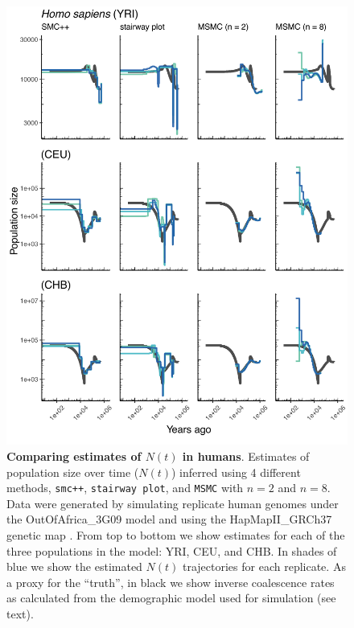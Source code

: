 \documentclass[12pt,halfline,a4paper]{ouparticle}
\newcommand{\MSMC}{\texttt{MSMC}\xspace}
\newcommand{\smcpp}{\texttt{smc++}\xspace}
\newcommand{\stairwayplot}{\texttt{stairway plot}\xspace}
\begin{document}
\begin{figure}
\begin{center}
\includegraphics[width=0.8\linewidth]{display_items/HomSap_OutOfAfrica_3G09.pdf}
\caption{\textbf{Comparing estimates of $N(t)$ in humans}. Estimates of population
size over time ($N(t)$) inferred using 4 different methods, \smcpp, \stairwayplot, and
\MSMC with $n=2$ and $n=8$. Data were generated by simulating
replicate human genomes under the OutOfAfrica\_3G09 model \citep{gutenkunst2009inferring}
and using the HapMapII\_GRCh37 genetic map \citep{international2007second}.
From top to bottom we show estimates for each of the three populations in the model:
YRI, CEU, and CHB. In shades of blue we show the estimated
$N(t)$ trajectories for each replicate.
As a proxy for the ``truth'', in black we show inverse coalescence rates
as calculated from the demographic model used for simulation (see text).
}
\label{fig:n_t_gutenkunst}
\end{center}
\end{figure}
\end{document}
